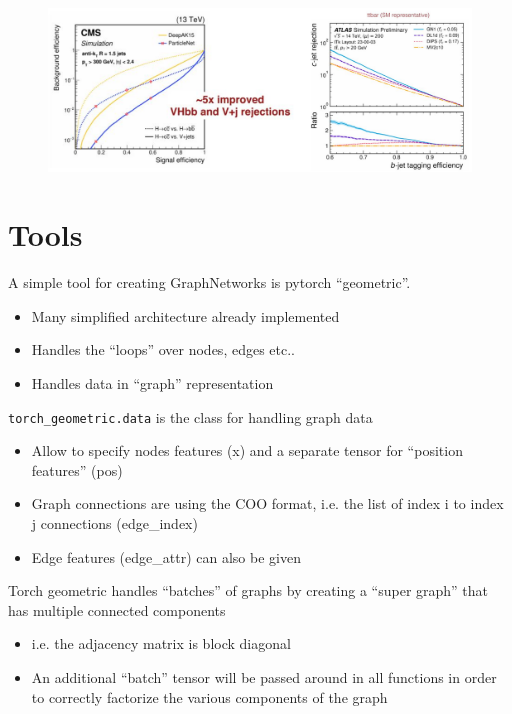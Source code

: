 \begin{figure}[ht]
	\centering
	\includegraphics[width=0.8\linewidth]{figure_ml/btag_results}
\end{figure}
\FloatBarrier


\section{Tools}

A simple tool for creating GraphNetworks is pytorch “geometric”.
\begin{itemize}
	\item Many simplified architecture already implemented
	\item Handles the “loops” over nodes, edges etc..
	\item Handles data in “graph” representation
\end{itemize}

\texttt{torch\_geometric.data} is the class for handling
graph data

\begin{itemize}
	\item Allow to specify nodes features (x) and a separate tensor for “position features” (pos)
	\item Graph connections are using the COO format, i.e. the list of index i to index j connections (edge\_index)
	\item Edge features (edge\_attr) can also be given
\end{itemize}

Torch geometric handles “batches” of graphs
by creating a “super graph” that has multiple
connected components
\begin{itemize}
	\item i.e. the adjacency matrix is block diagonal
	\item An additional “batch” tensor will be passed around in
	all functions in order to correctly factorize the various components of the graph
\end{itemize}

